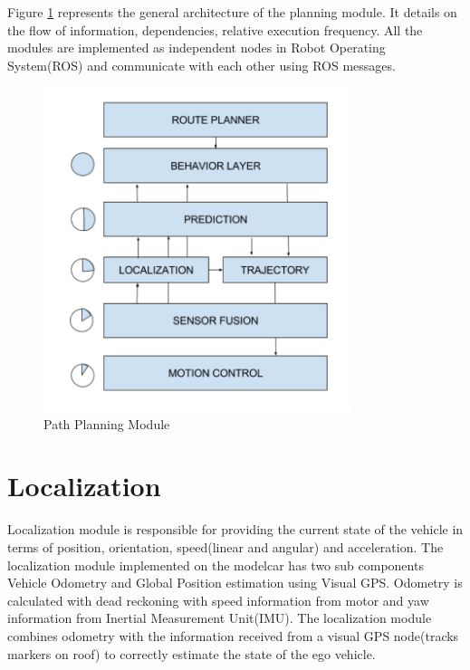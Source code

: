 Figure \ref{path_planner} represents the general architecture of the planning module. It details on the flow of information, dependencies, relative execution frequency. All the modules are implemented as independent nodes in Robot Operating System(ROS) and communicate with each other using ROS messages.
\begin{figure}[h]
    \centering
    \includegraphics[width=0.8\textwidth]{Images/path_planner.png}
    \caption{Path Planning Module}
    \label{path_planner}
\end{figure}

\section{Localization} \label{localization}

Localization module is responsible for providing the current state of the vehicle in terms of position, orientation, speed(linear and angular) and acceleration. The localization module implemented on the modelcar has two sub components Vehicle Odometry and Global Position estimation using Visual GPS. Odometry is calculated with dead reckoning \cite{dead_reckoning} with speed information from motor and yaw information from Inertial Measurement Unit(IMU). The localization module combines odometry with the information received from a visual GPS node(tracks markers on roof) to correctly estimate the state of the ego vehicle. 

